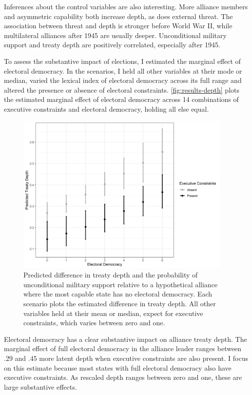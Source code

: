 \documentclass[12pt]{article}
\begin{document}
Inferences about the control variables are also interesting.
More alliance members and asymmetric capability both increase depth, as does external threat.
The association between threat and depth is stronger before World War II, while multilateral alliances after 1945 are usually deeper. 
Unconditional military support and treaty depth are positively correlated, especially after 1945. 


To assess the substantive impact of elections, I estimated the marginal effect of electoral democracy. 
In the scenarios, I held all other variables at their mode or median, varied the lexical index of electoral democracy across its full range and altered the presence or absence of electoral constraints. 
\autoref{fig:results-depth} plots the estimated marginal effect of electoral democracy across 14 combinations of executive constraints and electoral democracy, holding all else equal. 


\begin{figure}[hbtp]
\centering
\includegraphics[width=0.95\textwidth]{../figures/results-depth.png}
\caption{Predicted difference in treaty depth and the probability of unconditional military support relative to a hypothetical alliance where the most capable state has no electoral democracy. Each scenario plots the estimated difference in treaty depth. All other variables held at their mean or median, expect for executive constraints, which varies between zero and one.}
\label{fig:results-depth}
\end{figure}


Electoral democracy has a clear substantive impact on alliance treaty depth.
The marginal effect of full electoral democracy in the alliance leader ranges between .29 and .45 more latent depth when executive constraints are also present.
I focus on this estimate because most states with full electoral democracy also have executive constraints. 
As rescaled depth ranges between zero and one, these are large substantive effects.
\end{document}

